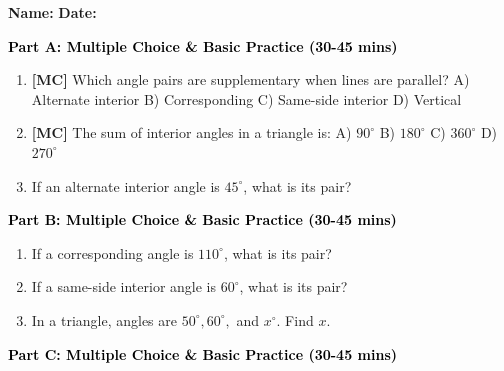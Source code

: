 \documentclass[12pt, letterpaper, fleqn]{article}
\newcommand{\blank}{\underline{\hspace{2.2cm}}}
\begin{document}
\textbf{Name:} \underline{\hspace{5cm}}
\hfill
\textbf{Date:} \underline{\hspace{3cm}}\\


\begin{tcolorbox}[colback=customteal!20]
\large\textcolor{black}{\textbf{Part A: Multiple Choice \& Basic Practice (30-45 mins)}}
\end{tcolorbox}

\vspace{3mm}

\begin{enumerate}[itemsep=2.5cm, leftmargin=0.6cm]
\item \textbf{[MC]} Which angle pairs are supplementary when lines are parallel?
A) Alternate interior B) Corresponding C) Same-side interior D) Vertical
\item \textbf{[MC]} The sum of interior angles in a triangle is:
A) $90^\circ$ B) $180^\circ$ C) $360^\circ$ D) $270^\circ$
\item If an alternate interior angle is $45^\circ$, what is its pair? \blank
\end{enumerate}

\newpage

\begin{tcolorbox}[colback=customteal!20]
\large\textcolor{black}{\textbf{Part B: Multiple Choice \& Basic Practice (30-45 mins)}}
\end{tcolorbox}

\vspace{3mm}

\begin{enumerate}[itemsep=2.5cm, leftmargin=0.6cm, resume]
\item If a corresponding angle is $110^\circ$, what is its pair? \blank
\item If a same-side interior angle is $60^\circ$, what is its pair? \blank
\item In a triangle, angles are $50^\circ, 60^\circ,$ and $x^\circ$. Find $x$. \blank
\end{enumerate}

\newpage

\begin{tcolorbox}[colback=customteal!20]
\large\textcolor{black}{\textbf{Part C: Multiple Choice \& Basic Practice (30-45 mins)}}
\end{tcolorbox}
\end{document}
